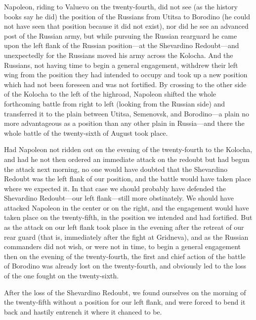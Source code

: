 Napoleon, riding to Valuevo on the twenty-fourth, did not see (as
the history books say he did) the position of the Russians from
Utitsa to Borodino (he could not have seen that position because
it did not exist), nor did he see an advanced post of the Russian
army, but while pursuing the Russian rearguard he came upon the
left flank of the Russian position---at the Shevardino
Redoubt---and unexpectedly for the Russians moved his army across
the Kolocha. And the Russians, not having time to begin a general
engagement, withdrew their left wing from the position they had
intended to occupy and took up a new position which had not been
foreseen and was not fortified. By crossing to the other side of
the Kolocha to the left of the highroad, Napoleon shifted the
whole forthcoming battle from right to left (looking from the
Russian side) and transferred it to the plain between Utitsa,
Semenovsk, and Borodino---a plain no more advantageous as a
position than any other plain in Russia---and there the whole
battle of the twenty-sixth of August took place.

Had Napoleon not ridden out on the evening of the twenty-fourth
to the Kolocha, and had he not then ordered an immediate attack
on the redoubt but had begun the attack next morning, no one
would have doubted that the Shevardino Redoubt was the left flank
of our position, and the battle would have taken place where we
expected it. In that case we should probably have defended the
Shevardino Redoubt---our left flank---still more obstinately. We
should have attacked Napoleon in the center or on the right, and
the engagement would have taken place on the twenty-fifth, in the
position we intended and had fortified. But as the attack on our
left flank took place in the evening after the retreat of our
rear guard (that is, immediately after the fight at Gridneva),
and as the Russian commanders did not wish, or were not in time,
to begin a general engagement then on the evening of the
twenty-fourth, the first and chief action of the battle of
Borodino was already lost on the twenty-fourth, and obviously led
to the loss of the one fought on the twenty-sixth.

After the loss of the Shevardino Redoubt, we found ourselves on
the morning of the twenty-fifth without a position for our left
flank, and were forced to bend it back and hastily entrench it
where it chanced to be.

